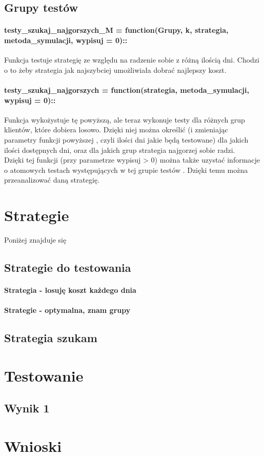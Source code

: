 \documentclass{article}
\begin{document}
\subsection{Grupy testów}
\paragraph{testy\_szukaj\_najgorszych\_M = function(Grupy, k, strategia, metoda\_symulacji, wypisuj = 0)::} Funkcja testuje strategię
ze względu na radzenie sobie z różną ilością dni. Chodzi o to żeby strategia jak najszybciej umożliwiała dobrać
najlepszy koszt.
\paragraph{testy\_szukaj\_najgorszych = function(strategia, metoda\_symulacji, wypisuj = 0)::} Funkcja wykożystuje tę powyższą, ale teraz
wykonuje testy dla różnych grup klientów, które dobiera losowo. Dzięki niej można określić (i zmieniając parametry funkcji powyższej
, czyli ilości dni jakie będą testowane) dla jakich ilości dostępnych dni, oraz dla jakich grup strategia najgorzej sobie radzi.
\\ Dzięki tej funkcji (przy parametrze wypisuj > 0) można także uzystać informacje o atomowych testach występujących w tej grupie testów
. Dzięki temu można przeanalizować daną strategię.

\section{Strategie}
Poniżej znajduje się 
\subsection{Strategie do testowania}
\paragraph{Strategia - losuję koszt każdego dnia}
\paragraph{Strategie - optymalna, znam grupy}
\subsection{Strategia szukam}

\section{Testowanie}
\subsection{Wynik 1}

\section{Wnioski}
\end{document}
